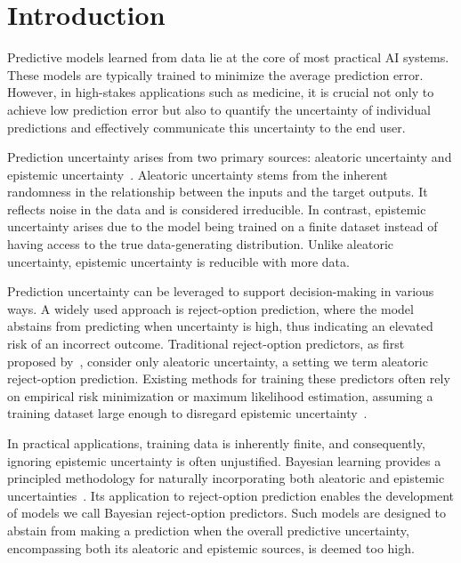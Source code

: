 \section{Introduction}

Predictive models learned from data lie at the core of most practical AI systems. These models are typically trained to minimize the average prediction error. However, in high-stakes applications such as medicine, it is crucial not only to achieve low prediction error but also to quantify the uncertainty of individual predictions and effectively communicate this uncertainty to the end user.

Prediction uncertainty arises from two primary sources: aleatoric uncertainty and epistemic uncertainty~\cite{Hullermeier-Intro-ML2021}. Aleatoric uncertainty stems from the inherent randomness in the relationship between the inputs and the target outputs. It reflects noise in the data and is considered irreducible. In contrast, epistemic uncertainty arises due to the model being trained on a finite dataset instead of having access to the true data-generating distribution. Unlike aleatoric uncertainty, epistemic uncertainty is reducible with more data.

Prediction uncertainty can be leveraged to support decision-making in various ways. A widely used approach is reject-option prediction, where the model abstains from predicting when uncertainty is high, thus indicating an elevated risk of an incorrect outcome. Traditional reject-option predictors, as first proposed by~\cite{Chow-RejectOpt-TIT1970}, consider only aleatoric uncertainty, a setting we term aleatoric reject-option prediction. Existing methods for training these predictors often rely on empirical risk minimization or maximum likelihood estimation, assuming a training dataset large enough to disregard epistemic uncertainty~\cite{Hendrickx-MLwithRejectOpt-ML2024}.

In practical applications, training data is inherently finite, and consequently, ignoring epistemic uncertainty is often unjustified. Bayesian learning provides a principled methodology for naturally incorporating both aleatoric and epistemic uncertainties~\cite{Bishop-PRML-2006,Gelman-Bayesian-2013}. Its application to reject-option prediction enables the development of models we call Bayesian reject-option predictors. Such models are designed to abstain from making a prediction when the overall predictive uncertainty, encompassing both its aleatoric and epistemic sources, is deemed too high.

